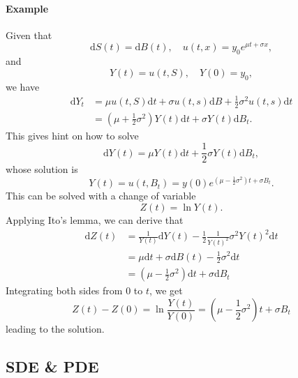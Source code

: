 \documentclass[twocolumn,landscape,10pt]{article}
\theoremstyle{definition}
\begin{document}
\paragraph{Example}
Given that
\[
    \mathrm{d}S(t)=\mathrm{d}B(t),\quad
    u(t,x)=y_0e^{\mu t + \sigma x},
\]
and
\[
    Y(t) = u(t, S),\quad
    Y(0)=y_0,
\]
we have
\begin{align*}
    \mathrm{d}Y_t
    &=\mu u(t,S)\mathrm{d}t+\sigma u(t,s)\mathrm{d}B
    +\frac{1}{2}\sigma^2 u(t,s)\mathrm{d}t \\
    &=\left(\mu+\frac{1}{2}\sigma^2\right)Y(t)\mathrm{d}t
    +\sigma Y(t)\mathrm{d}B_t.
\end{align*}
This gives hint on how to solve
\[
    \mathrm{d}Y(t)=\mu Y(t)\mathrm{d}t+\frac{1}{2}\sigma Y(t)\mathrm{d}B_t,
\]
whose solution is
\[
    Y(t)=u(t,B_t)
    =y(0)e^{\left(\mu - \frac{1}{2}\sigma^2\right)t+\sigma B_t}.
\]
This can be solved with a change of variable
\[
    Z(t)=\ln Y(t).
\]
Applying Ito's lemma, we can derive that
\begin{align*}
    \mathrm{d}Z(t)
    &=\frac{1}{Y(t)}\mathrm{d}Y(t)-\frac{1}{2}\frac{1}{Y(t)^2}\sigma^2Y(t)^2\mathrm{d}t\\
    &=\mu\mathrm{d}t+\sigma\mathrm{d}B(t)-\frac{1}{2}\sigma^2\mathrm{d}t \\
    &=\left(\mu-\frac{1}{2}\sigma^2\right)\mathrm{d}t+\sigma\mathrm{d}B_t
\end{align*}
Integrating both sides from 0 to $t$, we get
\[
    Z(t)-Z(0)=\ln{\frac{Y(t)}{Y(0)}}
    =\left(\mu-\frac{1}{2}\sigma^2\right)t+\sigma B_t
\]
leading to the solution.


\subsection{SDE \& PDE}
\end{document}
